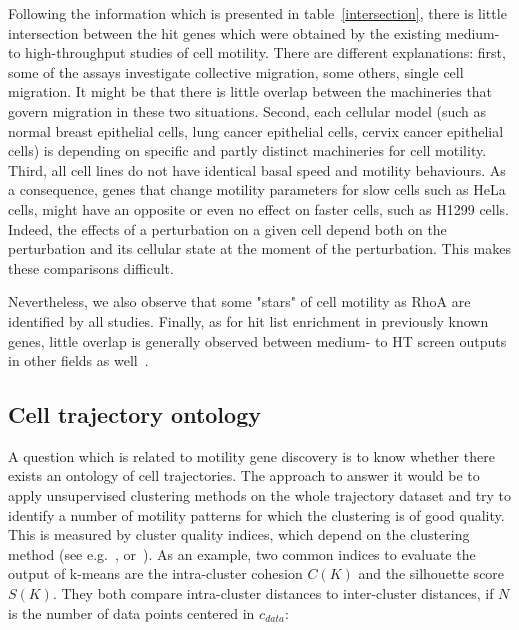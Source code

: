 Following the information which is presented in
table~\ref{intersection}, there is little intersection between the hit
genes which were obtained by the existing medium- to high-throughput
studies of cell motility. There are different explanations: first,
some of the assays investigate collective migration, some others, single cell
migration. It might be that there is little overlap between the machineries that govern
migration in these two situations. Second, each cellular model (such
as normal breast epithelial cells, lung cancer epithelial cells,
cervix cancer epithelial cells) is depending on specific and partly
distinct machineries for cell motility. Third, all cell lines do not have identical basal speed and motility behaviours. As a consequence, genes that change motility parameters for slow cells such as HeLa cells, might have an opposite or even no effect on faster cells, such as H1299 cells. Indeed, the effects of a perturbation on a given cell depend both on the perturbation and its cellular state at the
moment of the perturbation. This makes these comparisons difficult.%

Nevertheless, we also observe that some "stars" of cell motility as
RhoA are identified by all studies. Finally, as for hit list enrichment in
previously known genes, little overlap is generally observed between
medium- to HT screen outputs in other fields as well~\cite{pmid20360735}. 


\subsection{Cell trajectory ontology}
\label{sec:ontology}
A question which is related to motility gene discovery is to know
whether there exists an ontology of cell trajectories. The approach to
answer it would be to apply unsupervised clustering methods on the
whole trajectory dataset and try to identify a number of motility
patterns for which the clustering is of good quality. This is measured
by cluster quality indices, which depend on the clustering method (see
e.g.~\cite[Chapter~8]{Tan:2005:IDM:1095618}, or~\cite{Halkidi}). As an
example, two common indices to evaluate the output of k-means are the
intra-cluster cohesion $C(K)$ and the silhouette score $S(K)$. They
both compare intra-cluster distances to inter-cluster distances, if
$N$ is the number of data points centered in $c_{data}$:


